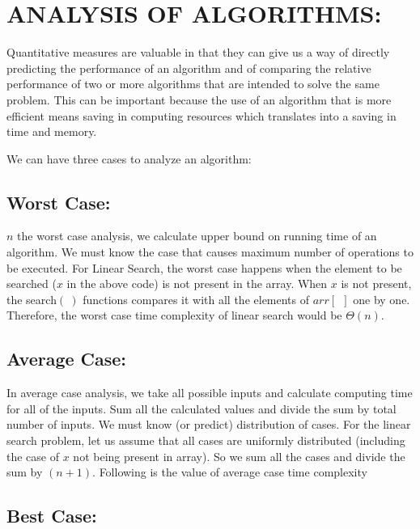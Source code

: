 \documentclass[10pt,english]{article}
\begin{document}
\section{ANALYSIS OF ALGORITHMS:}

Quantitative measures are valuable in that they can give us a way
of directly predicting the performance of an algorithm and of comparing
the relative performance of two or more algorithms that are intended
to solve the same problem. This can be important because the use of
an algorithm that is more efficient means saving in computing resources
which translates into a saving in time and memory. 

We can have three cases to analyze an algorithm: 

\subsection{Worst Case: }

$n$ the worst case analysis, we calculate upper bound on running
time of an algorithm. We must know the case that causes maximum number
of operations to be executed. For Linear Search, the worst case happens
when the element to be searched ($x$ in the above code) is not present
in the array. When $x$ is not present, the search$(\:)$ functions
compares it with all the elements of $arr[\: \:]$ one by one. Therefore,
the worst case time complexity of linear search would be $\Theta (n)$.

\subsection{Average Case: }

In average case analysis, we take all possible inputs and calculate
computing time for all of the inputs. Sum all the calculated values
and divide the sum by total number of inputs. We must know (or predict)
distribution of cases. For the linear search problem, let us assume
that all cases are uniformly distributed (including the case of $x$
not being present in array). So we sum all the cases and divide the
sum by $(n+1)$. Following is the value of average case time complexity

\subsection{Best Case: }
\end{document}

